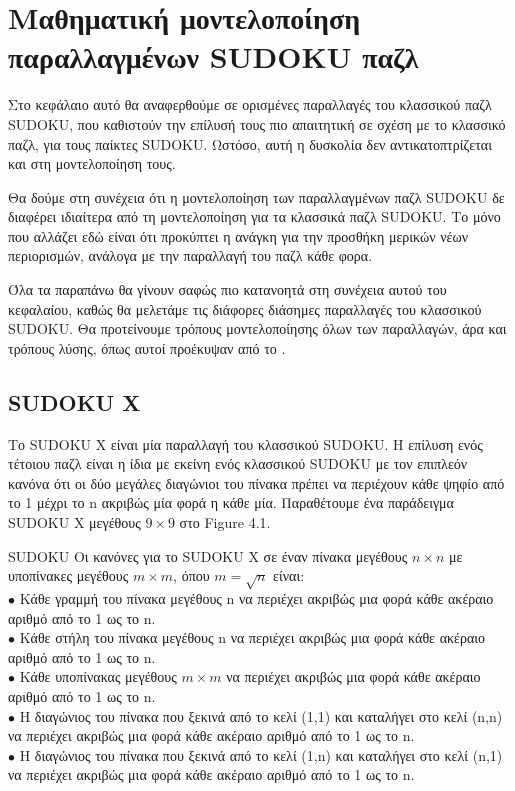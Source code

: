 \documentclass[12pt]{book}
\theoremstyle{definition}
\begin{document}
\section{Μαθηματική μοντελοποίηση παραλλαγμένων SUDOKU παζλ}

Στο κεφάλαιο αυτό θα αναφερθούμε σε ορισμένες παραλλαγές του κλασσικού παζλ SUDOKU, που καθιστούν την επίλυσή τους πιο απαιτητική σε σχέση με το κλασσικό παζλ, για τους παίκτες SUDOKU. Ωστόσο, αυτή η δυσκολία δεν αντικατοπτρίζεται και στη μοντελοποίηση τους. \par 

Θα δούμε στη συνέχεια ότι η μοντελοποίηση των παραλλαγμένων παζλ SUDOKU δε διαφέρει ιδιαίτερα από τη μοντελοποίηση για τα κλασσικά παζλ SUDOKU. Το μόνο που αλλάζει εδώ είναι ότι προκύπτει η ανάγκη για την προσθήκη μερικών νέων περιορισμών, ανάλογα με την παραλλαγή του παζλ κάθε φορα. \par

Όλα τα παραπάνω θα γίνουν σαφώς πιο κατανοητά στη συνέχεια αυτού του κεφαλαίου, καθώς θα μελετάμε τις διάφορες διάσημες παραλλαγές του κλασσικού SUDOKU. Θα προτείνουμε τρόπους μοντελοποίησης όλων των παραλλαγών, άρα και τρόπους λύσης, όπως αυτοί προέκυψαν από το \cite{3}.

\subsection{SUDOKU X}

Το SUDOKU X είναι μία παραλλαγή του κλασσικού SUDOKU. Η επίλυση ενός τέτοιου παζλ είναι η ίδια με εκείνη ενός κλασσικού SUDOKU με τον επιπλεόν κανόνα ότι οι δύο μεγάλες διαγώνιοι του πίνακα πρέπει να περιέχουν κάθε ψηφίο από το 1 μέχρι το n ακριβώς μία φορά η κάθε μία. Παραθέτουμε ένα παράδειγμα SUDOKU X μεγέθους \(9 \times 9 \) στο Figure 4.1.\par

\begin{mytheorem}{SUDOKU}{}
	Οι κανόνες για το SUDOKU X σε έναν πίνακα μεγέθους \(n \times n\) με υποπίνακες μεγέθους \(m \times m\), 	όπου \(m = \sqrt{n}\) είναι: \\
	\(\bullet\) Κάθε γραμμή του πίνακα μεγέθους n να περιέχει ακριβώς μια φορά κάθε ακέραιο αριθμό από το 1 ως το n. \\
	\(\bullet\) Κάθε στήλη του πίνακα μεγέθους n να περιέχει ακριβώς μια φορά κάθε ακέραιο αριθμό από το 1 ως το n. \\
	\(\bullet\) Κάθε υποπίνακας μεγέθους \(m \times m\) να περιέχει ακριβώς μια φορά κάθε ακέραιο αριθμό από το 1 ως το n. \\
	\(\bullet\) Η διαγώνιος του πίνακα που ξεκινά από το κελί (1,1) και καταλήγει στο κελί (n,n) να περιέχει ακριβώς μια φορά κάθε ακέραιο αριθμό από το 1 ως το n. \\
	\(\bullet\) Η διαγώνιος του πίνακα που ξεκινά από το κελί (1,n) και καταλήγει στο κελί (n,1) να περιέχει ακριβώς μια φορά κάθε ακέραιο αριθμό από το 1 ως το n. \\

\end{mytheorem}
\end{document}
